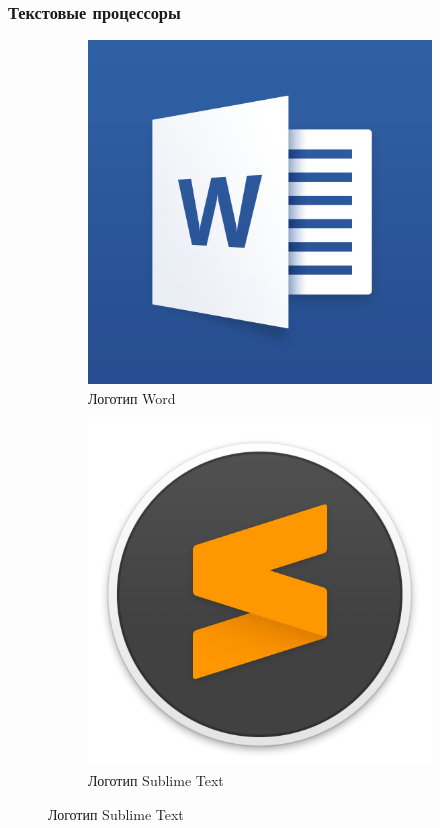 \documentclass[10pt, unicode]{beamer}
\begin{document}
    \begin{frame}
        \frametitle{Текстовые процессоры}
        \begin{figure}[h]
            \centering
            \begin{subfigure}[h]{0.49\textwidth}
                \includegraphics[width=\textwidth]{images/WordPic.png}
                \caption{Логотип Word}
            \end{subfigure}
            \begin{subfigure}[h]{0.49\textwidth}
                \includegraphics[width=\textwidth]{images/SublimePic.png}
                \caption{Логотип Sublime Text}
            \end{subfigure}
        \end{figure}
    \end{frame}
\end{document}
